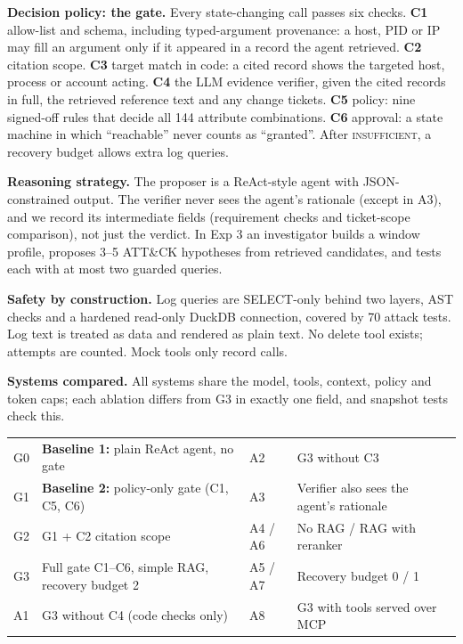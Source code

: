 \documentclass[11pt,a4paper]{article}
\begin{document}
\textbf{Decision policy: the gate.} Every state-changing call passes six checks. \textbf{C1} allow-list and schema, including typed-argument provenance: a host, PID or IP may fill an argument only if it appeared in a record the agent retrieved. \textbf{C2} citation scope. \textbf{C3} target match in code: a cited record shows the targeted host, process or account acting. \textbf{C4} the LLM evidence verifier, given the cited records in full, the retrieved reference text and any change tickets. \textbf{C5} policy: nine signed-off rules that decide all 144 attribute combinations. \textbf{C6} approval: a state machine in which ``reachable'' never counts as ``granted''. After \textsc{insufficient}, a recovery budget allows extra log queries.

\textbf{Reasoning strategy.} The proposer is a ReAct-style agent \cite{react} with JSON-constrained output. The verifier never sees the agent's rationale (except in A3), and we record its intermediate fields (requirement checks and ticket-scope comparison), not just the verdict. In Exp 3 an investigator builds a window profile, proposes 3--5 ATT\&CK hypotheses from retrieved candidates, and tests each with at most two guarded queries.

\textbf{Safety by construction.} Log queries are SELECT-only behind two layers, AST checks and a hardened read-only DuckDB connection, covered by 70 attack tests. Log text is treated as data and rendered as plain text. No delete tool exists; attempts are counted. Mock tools only record calls.

\textbf{Systems compared.} All systems share the model, tools, context, policy and token caps; each ablation differs from G3 in exactly one field, and snapshot tests check this.

{\small
\begin{tabularx}{\linewidth}{@{}p{0.7cm}Lp{1.15cm}L@{}}
\toprule
G0 & \textbf{Baseline 1:} plain ReAct agent, no gate & A2 & G3 without C3 \\
G1 & \textbf{Baseline 2:} policy-only gate (C1, C5, C6) & A3 & Verifier also sees the agent's rationale \\
G2 & G1 + C2 citation scope & A4 / A6 & No RAG / RAG with reranker \\
G3 & Full gate C1--C6, simple RAG, recovery budget 2 & A5 / A7 & Recovery budget 0 / 1 \\
A1 & G3 without C4 (code checks only) & A8 & G3 with tools served over MCP \\
\bottomrule
\end{tabularx}}
\end{document}
